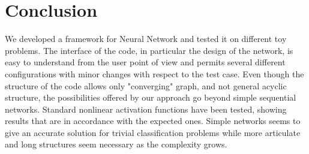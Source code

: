 \documentclass{article}
\begin{document}
 \section{Conclusion}\label{sec_conclusion}
We developed a framework for Neural Network and tested it on different toy problems. The interface of the code, in particular the design of the network, is easy to understand from the user point of view and permits several different configurations with minor changes with respect to the test case. Even though the structure of the code allows only "converging" graph, and not general acyclic structure, the possibilities offered by our approach go beyond simple sequential networks.
Standard nonlinear activation functions have been tested, showing results that are in accordance with the expected ones. Simple networks seems to give an accurate solution for trivial classification problems while more articulate and long structures seem necessary as the complexity grows.
 

 
  
  
  
\end{document}
